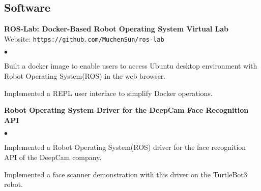 \documentclass[margin,line,pifont,palatino,courier]{res}
\newenvironment{list2}{
	\begin{list}{$\bullet$}{%
			\setlength{\itemsep}{0in}
			\setlength{\parsep}{0in} \setlength{\parskip}{0in}
			\setlength{\topsep}{0in} \setlength{\partopsep}{0in}
			\setlength{\leftmargin}{0.2in}}}{\end{list}}
\begin{document}
\begin{resume}
		\section{\sc Software}
		
		
		{\bf ROS-Lab: Docker-Based Robot Operating System Virtual Lab} \\
		Website: \verb+https://github.com/MuchenSun/ros-lab+ 
		\begin{list2}
			\item Built a docker image to enable users to access Ubuntu desktop environment with Robot Operating System(ROS) in the web browser.
			\item Implemented a REPL user interface to simplify Docker operations.
		\end{list2}
		
		{\bf Robot Operating System Driver for the DeepCam Face Recognition API} 
		\begin{list2}
			\item Implemented a Robot Operating System(ROS) driver for the face recognition API of the DeepCam company. %
			\item Implemented a face scanner demonstration with this driver on the TurtleBot3 robot.
		\end{list2}
	

\end{resume}
\end{document}
